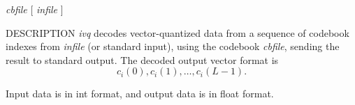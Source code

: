 % 
% 
% 
% 
%                                                                        
%

\begin{synopsis}
\item [ivq] [ --l $L$ ] [ --n $N$ ] {\em cbfile}  [ {\em infile} ] 
\end{synopsis}

\begin{qsection}{DESCRIPTION}
{\em ivq} decodes vector-quantized data from a sequence of codebook indexes
from {\em infile} (or standard input), 
using the codebook {\em cbfile}, 
sending the result to standard output. 
The decoded output vector format is
\begin{displaymath}
  c_i(0),c_i(1),\ldots,c_i(L-1). 
\end{displaymath}

Input data is in int format, and output data is in float format.
\end{qsection}

